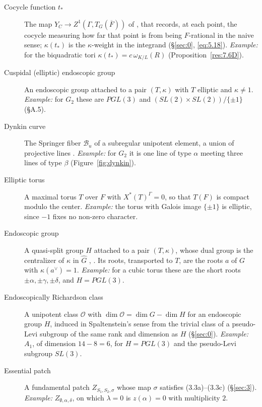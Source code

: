 \documentclass[12pt,letterpaper]{amsart}
\theoremstyle{plain}
\theoremstyle{definition}
\theoremstyle{remark}
\theoremstyle{definition}
\newcommand{\ovF}{\overline{F}}
\newcommand{\ooo}{\mathcal{O}}
\begin{document}
\begin{description}
\item[Cocycle function $t_*$] The map $Y_C\to Z^1(\Gamma,T_G(\ovF))$ of
\cite{La83}, \cite{Ha92a} that records, at each point, the cocycle measuring how
far that point is from being $F$-rational in the naive sense; $\kappa(t_*)$ is
the $\kappa$-weight in the integrand (\S\ref{sec:0}, \eqref{eq:5.18}).
\emph{Example:} for the biquadratic tori $\kappa(t_*)=c\,\omega_{K/L}(R)$
(Proposition~\ref{res:7.6D}).

\item[Cuspidal (elliptic) endoscopic group] An endoscopic group attached to a
pair $(T,\kappa)$ with $T$ elliptic and $\kappa\neq1$. \emph{Example:} for
$G_2$ these are $PGL(3)$ and $(SL(2)\times SL(2))/\{\pm1\}$ (\S A.5).

\item[Dynkin curve] The Springer fiber $\mathcal B_u$ of a subregular unipotent
element, a union of projective lines \cite{St74}. \emph{Example:} for $G_2$ it
is one line of type $\alpha$ meeting three lines of type $\beta$
(Figure~\ref{fig:dynkin}).

\item[Elliptic torus] A maximal torus $T$ over $F$ with $X^*(T)^\Gamma=0$, so that
$T(F)$ is compact modulo the center. \emph{Example:} the torus with Galois
image $\{\pm1\}$ is elliptic, since $-1$ fixes no non-zero character.

\item[Endoscopic group] A quasi-split group $H$ attached to a pair
$(T,\kappa)$, whose dual group is the centralizer of $\kappa$ in $\widehat G$
\cite{La79}, \cite{LS87}. Its roots, transported to $T$, are the roots $a$ of
$G$ with $\kappa(a^\vee)=1$. \emph{Example:} for a cubic torus these are the
short roots $\pm\alpha,\pm\gamma,\pm\delta$, and $H=PGL(3)$.

\item[Endoscopically Richardson class] A unipotent class $\ooo$ with
$\dim\ooo=\dim G-\dim H$ for an endoscopic group $H$, induced in
Spaltenstein's sense from the trivial class of a pseudo-Levi subgroup of the
same rank and dimension as $H$ (\S\ref{sec:0}). \emph{Example:} $A_1$, of
dimension $14-8=6$, for $H=PGL(3)$ and the pseudo-Levi subgroup $SL(3)$.

\item[Essential patch] A fundamental patch $Z_{S_1,S_2,\sigma}$ whose map
$\sigma$ satisfies (3.3a)--(3.3c) (\S\ref{sec:3}). \emph{Example:}
$Z_{\emptyset,\alpha,\delta}$, on which $\lambda=0$ is $z(\alpha)=0$ with
multiplicity $2$.


\end{description}
\end{document}
